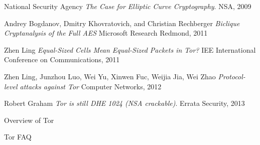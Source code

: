 \documentclass[journal]{IEEEtran}
\begin{document}
\begin{thebibliography}{9}
  National Security Agency
  \emph{The Case for Elliptic Curve Cryptography}.
  NSA, 2009

  Andrey Bogdanov, Dmitry Khovratovich, and Christian Rechberger
  \emph{Biclique Cryptanalysis of the Full AES}
  Microsoft Research Redmond, 2011

  Zhen Ling
  \emph{Equal-Sized Cells Mean Equal-Sized Packets in Tor?}
  IEE International Conference on Communications, 2011

  Zhen Ling, Junzhou Luo, Wei Yu, Xinwen Fuc, Weijia Jia, Wei Zhao
  \emph{Protocol-level attacks against Tor}
  Computer Networks, 2012

  Robert Graham
  \emph{Tor is still DHE 1024 (NSA crackable)}.
  Errata Security, 2013

  Overview of Tor

  Tor FAQ

\end{thebibliography}
\end{document}
